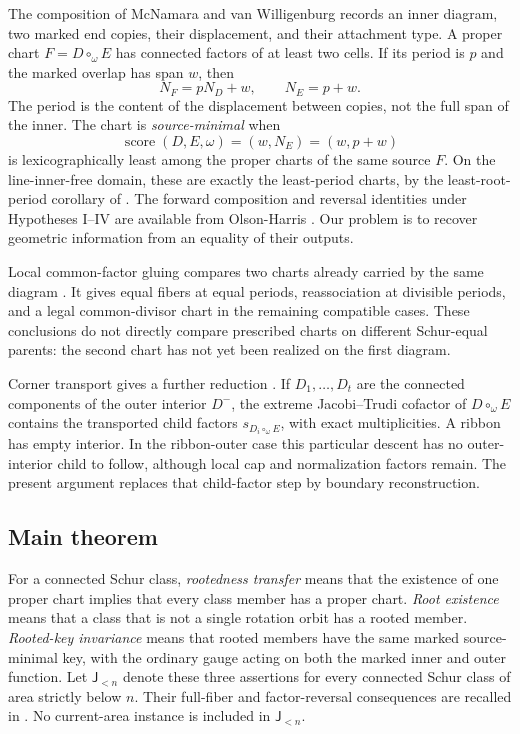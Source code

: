 \documentclass[11pt,a4paper]{amsart}
\numberwithin{equation}{section}
\theoremstyle{plain}
\theoremstyle{definition}
\newcommand{\score}{\operatorname{score}}
\newcommand{\Jlower}{\mathsf J_{<n}}
\begin{document}
The composition of McNamara and van Willigenburg
\cite{McNamara2009Classification} records an inner diagram, two marked end
copies, their displacement, and their attachment type.  A proper chart
\(F=D\circ_\omega E\) has connected factors of at least two cells.  If its period
is \(p\) and the marked overlap has span \(w\), then
\begin{equation}\label{eq:intro-span}
 N_F=pN_D+w,\qquad N_E=p+w.
\end{equation}
The period is the content of the displacement between copies, not the full
span of the inner.  The chart is \emph{source-minimal} when
\begin{equation}\label{eq:intro-score}
 \score(D,E,\omega)=(w,N_E)=(w,p+w)
\end{equation}
is lexicographically least among the proper charts of the same source \(F\).
On the line-inner-free domain, these are exactly the least-period charts,
by the least-root-period corollary of \cite{Shields2026Gluing}.
The forward composition and reversal identities under Hypotheses I--IV are
available from Olson-Harris \cite{OlsonHarris2024HopfApplications}.  Our problem
is to recover geometric information from an equality of their outputs.

Local common-factor gluing compares two charts already carried by the same
diagram \cite{Shields2026Gluing}.  It gives equal fibers at equal periods,
reassociation at divisible periods, and a legal common-divisor chart in the
remaining compatible cases.  These conclusions do not directly compare
prescribed charts on different Schur-equal parents: the second chart has not
yet been realized on the first diagram.

Corner transport gives a further reduction
\cite{Shields2026CornerDescent}.  If \(D_1,\ldots,D_t\) are the connected components
of the outer interior \(D^-\), the extreme Jacobi--Trudi cofactor of
\(D\circ_\omega E\) contains the transported child factors
\(s_{D_i\circ_\omega E}\), with exact multiplicities.  A ribbon has empty interior.
In the ribbon-outer case this particular descent has no outer-interior child
to follow, although local cap and normalization factors remain.  The present
argument replaces that child-factor step by boundary reconstruction.

\subsection{Main theorem}

For a connected Schur class, \emph{rootedness transfer} means that the existence
of one proper chart implies that every class member has a proper chart.
\emph{Root existence} means that a class that is not a single rotation orbit
has a rooted member.  \emph{Rooted-key invariance} means that rooted members
have the same marked source-minimal key, with the ordinary gauge acting on
both the marked inner and outer function.  Let \(\Jlower\) denote these three
assertions for every connected Schur class of area strictly below \(n\).
Their full-fiber and factor-reversal consequences are recalled in
.  No current-area instance is included in \(\Jlower\).
\end{document}

